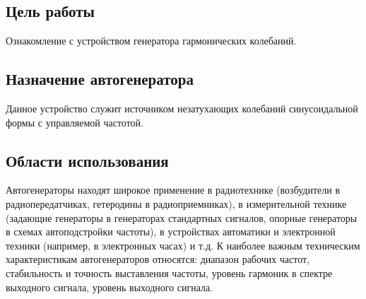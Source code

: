 
\def\labnumber{1}
\def\labtheme{Генератор гармонических колебаний}






\subsection*{Цель работы}
Ознакомление с устройством генератора гармонических колебаний.

\subsection*{Назначение автогенератора}
Данное устройство служит источником незатухающих колебаний синусоидальной формы с управляемой частотой.

\subsection*{Области использования}
Автогенераторы находят широкое применение в радиотехнике (возбудители в радиопередатчиках, гетеродины в радиоприемниках), в измерительной технике (задающие генераторы в генераторах стандартных сигналов, опорные генераторы в схемах автоподстройки частоты), в устройствах автоматики и электронной техники (например, в электронных часах) и т.д.
К наиболее важным техническим характеристикам автогенераторов относятся: диапазон рабочих частот, стабильность и точность выставления частоты, уровень гармоник в спектре выходного сигнала, уровень выходного сигнала.

